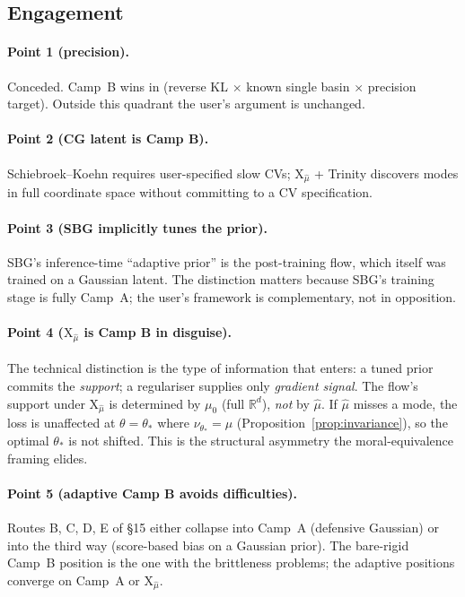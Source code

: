 \documentclass[11pt,letterpaper]{article}
\newcommand{\Real}{\mathbb{R}}
\newcommand{\Xfun}{\mathrm{X}}
\theoremstyle{plain}
\begin{document}
\subsection{Engagement}

\paragraph{Point 1 (precision).} Conceded. Camp~B wins in
(reverse KL $\times$ known single basin $\times$ precision target). Outside this
quadrant the user's argument is unchanged.

\paragraph{Point 2 (CG latent is Camp B).} Schiebroek--Koehn requires user-specified
slow CVs; $\Xfun_{\hat\mu}$ + Trinity discovers modes in full coordinate space
without committing to a CV specification.

\paragraph{Point 3 (SBG implicitly tunes the prior).} SBG's inference-time
``adaptive prior'' is the post-training flow, which itself was trained on a
Gaussian latent. The distinction matters because SBG's training stage is fully
Camp~A; the user's framework is complementary, not in opposition.

\paragraph{Point 4 ($\Xfun_{\hat\mu}$ is Camp B in disguise).} The technical
distinction is the type of information that enters: a tuned prior commits the
\emph{support}; a regulariser supplies only \emph{gradient signal}. The flow's
support under $\Xfun_{\hat\mu}$ is determined by $\mu_0$ (full $\Real^d$),
\emph{not} by $\hat\mu$. If $\hat\mu$ misses a mode, the loss is unaffected at
$\theta=\theta_*$ where $\nu_{\theta_*}=\mu$ (Proposition~\ref{prop:invariance}),
so the optimal $\theta_*$ is not shifted. This is the structural asymmetry the
moral-equivalence framing elides.

\paragraph{Point 5 (adaptive Camp B avoids difficulties).} Routes B, C, D, E of
\S15 either collapse into Camp~A (defensive Gaussian) or into the third way
(score-based bias on a Gaussian prior). The bare-rigid Camp~B position is the
one with the brittleness problems; the adaptive positions converge on Camp~A or
$\Xfun_{\hat\mu}$.
\end{document}
